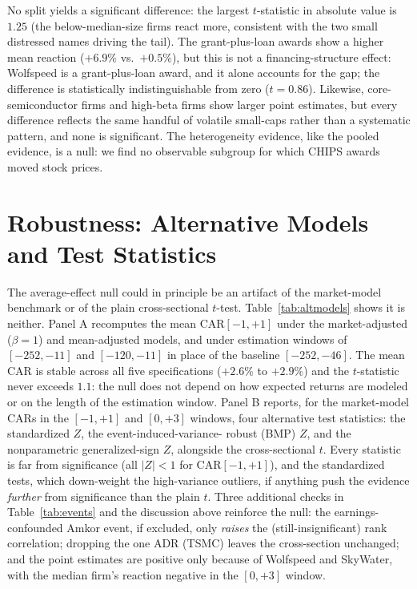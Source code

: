 \documentclass[12pt]{article}
\begin{document}
No split yields a significant difference: the largest $t$-statistic in absolute value is $1.25$
(the below-median-size firms react more, consistent with the two small distressed names driving
the tail). The grant-plus-loan awards show a higher mean reaction ($+6.9\%$ vs.\ $+0.5\%$), but
this is not a financing-structure effect: Wolfspeed is a grant-plus-loan award, and it alone
accounts for the gap; the difference is statistically indistinguishable from zero ($t=0.86$).
Likewise, core-semiconductor firms and high-beta firms show larger point estimates, but every
difference reflects the same handful of volatile small-caps rather than a systematic pattern, and
none is significant. The heterogeneity evidence, like the pooled evidence, is a null: we find no
observable subgroup for which CHIPS awards moved stock prices.

\section{Robustness: Alternative Models and Test Statistics}\label{sec:robust}
The average-effect null could in principle be an artifact of the market-model benchmark or of the
plain cross-sectional $t$-test. Table~\ref{tab:altmodels} shows it is neither. Panel A recomputes
the mean CAR$[-1,+1]$ under the market-adjusted ($\beta=1$) and mean-adjusted models, and under
estimation windows of $[-252,-11]$ and $[-120,-11]$ in place of the baseline $[-252,-46]$. The
mean CAR is stable across all five specifications ($+2.6\%$ to $+2.9\%$) and the $t$-statistic never
exceeds $1.1$: the null does not depend on how expected returns are modeled or on the length of the
estimation window. Panel B reports, for the market-model CARs in the $[-1,+1]$ and $[0,+3]$ windows,
four alternative test statistics: the standardized \citet{patell1976} $Z$, the event-induced-variance-
robust \citet{boehmer1991} (BMP) $Z$, and the nonparametric \citet{cowan1992} generalized-sign $Z$,
alongside the cross-sectional $t$. Every statistic is far from significance (all $|Z|<1$ for
CAR$[-1,+1]$), and the standardized tests, which down-weight the high-variance outliers, if anything
push the evidence \emph{further} from significance than the plain $t$. Three additional checks in
Table~\ref{tab:events} and the discussion above reinforce the null: the earnings-confounded Amkor
event, if excluded, only \emph{raises} the (still-insignificant) rank correlation; dropping the one
ADR (TSMC) leaves the cross-section unchanged; and the point estimates are positive only because of
Wolfspeed and SkyWater, with the median firm's reaction negative in the $[0,+3]$ window.
\end{document}

